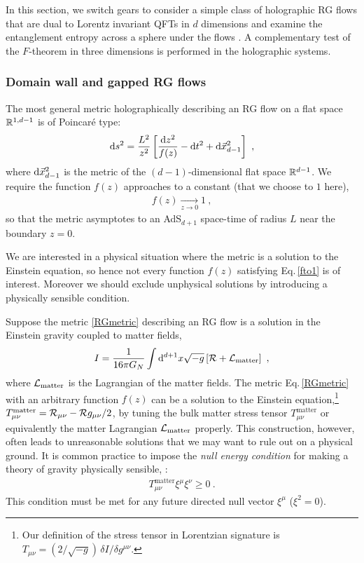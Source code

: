 In this section, we switch gears to consider a simple class of holographic RG flows that are dual to Lorentz invariant QFTs in $d$ dimensions and examine the entanglement entropy across a sphere under the flows \cite{Liu:2012eea,Klebanov:2012yf,Liu:2013una}.
A complementary test of the $F$-theorem in three dimensions is performed in the holographic systems.


\subsubsection{Domain wall and gapped RG flows}
The most general metric holographically describing an RG flow on a flat space $\mathbb{R}^{1,d-1}$ is of Poincar{\' e} type:
\begin{align}\label{RGmetric}
\mathrm{d} s^2 = \frac{L^2}{z^2}\left[  \frac{\mathrm{d} z^2}{f(z)} - \mathrm{d} t^2 + \mathrm{d}{\vec x}^2_{d-1} \right] \ ,
\end{align}
where $\mathrm{d} {\vec x}^2_{d-1}$ is the metric of the $(d-1)$-dimensional flat space $\mathbb{R}^{d-1}$.
We require the function $f(z)$ approaches to a constant (that we choose to $1$ here),
\begin{align}\label{fto1}
f(z) \xrightarrow[z\to 0]{}1 \ ,
\end{align}
so that the metric asymptotes to an AdS$_{d+1}$ space-time of radius $L$ near the boundary $z=0$.

We are interested in a physical situation where the metric is a solution to the Einstein equation, so hence not every function $f(z)$ satisfying Eq.\,\eqref{fto1} is of interest.
Moreover we should exclude unphysical solutions by introducing a physically sensible condition.

Suppose the metric \eqref{RGmetric} describing an RG flow is a solution in the Einstein gravity coupled to matter fields,
\begin{align}
I = \frac{1}{16\pi G_N} \int \mathrm{d}^{d+1} x \sqrt{-g} \left[ {\cal R} + {\cal L}_\text{matter} \right] \ ,
\end{align}
where ${\cal L}_\text{matter}$ is the Lagrangian of the matter fields.
The metric Eq.\,\eqref{RGmetric} with an arbitrary function $f(z)$ can be a solution to the Einstein equation,\footnote{Our definition of the stress tensor in Lorentzian signature is $T_{\mu\nu} = (2/\sqrt{-g})\,\delta I/ \delta g^{\mu\nu}$.} $T_{\mu\nu}^\text{matter} = {\cal R}_{\mu\nu} - {\cal R} g_{\mu\nu}/2$, by tuning the bulk matter stress tensor $T_{\mu\nu}^\text{matter}$ or equivalently the matter Lagrangian ${\cal L}_\text{matter}$ properly.
This construction, however, often leads to unreasonable solutions that we may want to rule out on a physical ground.
It is common practice to impose the \emph{null energy condition} for making a theory of gravity physically sensible, \cite{Hawking:1973uf}:
\begin{align}\label{NEC}
T_{\mu\nu}^\text{matter} \xi^\mu \xi^\nu \ge 0 \ .
\end{align}
This condition must be met for any future directed null vector $\xi^\mu$ ($\xi^2 = 0$).


